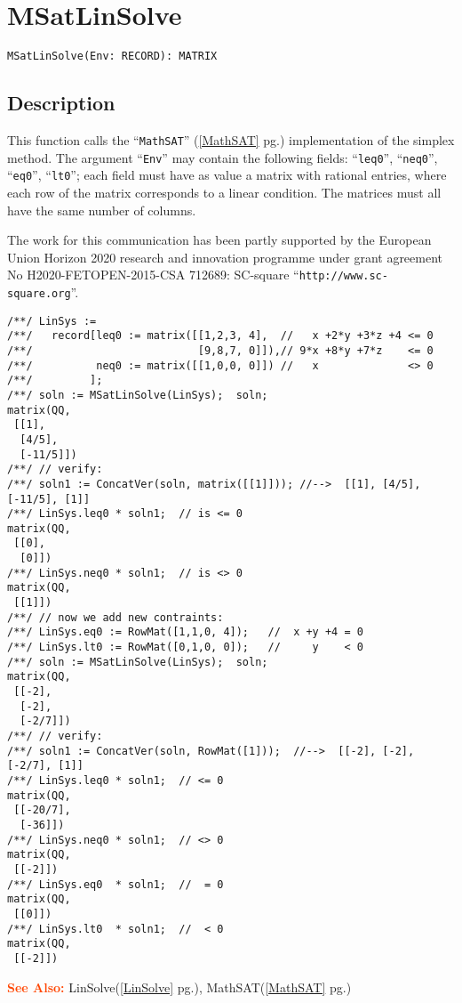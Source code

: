 \documentclass[a4paper]{mybook}
\newenvironment{command}{}{} %
\newcommand\SeeAlso{\par\textcolor{OrangeRed}{\textbf{\large See Also: }}}
\begin{document}
\section{MSatLinSolve}
\label{MSatLinSolve}
\begin{command} %


\begin{Verbatim}[label=syntax, rulecolor=\color{MidnightBlue},
frame=single]
MSatLinSolve(Env: RECORD): MATRIX
\end{Verbatim}


\subsection*{Description}

This function calls the ``\verb&MathSAT&'' (\ref{MathSAT} pg.\pageref{MathSAT}) implementation of the simplex method.
The argument ``\verb&Env&'' may contain the following fields: ``\verb&leq0&'', ``\verb&neq0&'',
``\verb&eq0&'', ``\verb&lt0&''; each field must have as value a matrix with rational entries,
where each row of the matrix corresponds to a linear condition.  The matrices
must all have the same number of columns.
\par 
The work for this communication has been partly supported by the
European Union Horizon 2020 research and innovation programme
under grant agreement No H2020-FETOPEN-2015-CSA 712689:
SC-square ``\verb&http://www.sc-square.org&''.
\begin{Verbatim}[label=example, rulecolor=\color{PineGreen}, frame=single]
/**/ LinSys := 
/**/   record[leq0 := matrix([[1,2,3, 4],  //   x +2*y +3*z +4 <= 0
/**/                          [9,8,7, 0]]),// 9*x +8*y +7*z    <= 0
/**/          neq0 := matrix([[1,0,0, 0]]) //   x              <> 0
/**/         ];
/**/ soln := MSatLinSolve(LinSys);  soln;
matrix(QQ,
 [[1],
  [4/5],
  [-11/5]])
/**/ // verify:
/**/ soln1 := ConcatVer(soln, matrix([[1]])); //-->  [[1], [4/5], [-11/5], [1]]
/**/ LinSys.leq0 * soln1;  // is <= 0
matrix(QQ,
 [[0],
  [0]])
/**/ LinSys.neq0 * soln1;  // is <> 0
matrix(QQ,
 [[1]])
/**/ // now we add new contraints:
/**/ LinSys.eq0 := RowMat([1,1,0, 4]);   //  x +y +4 = 0
/**/ LinSys.lt0 := RowMat([0,1,0, 0]);   //     y    < 0
/**/ soln := MSatLinSolve(LinSys);  soln;
matrix(QQ,
 [[-2],
  [-2],
  [-2/7]])
/**/ // verify:
/**/ soln1 := ConcatVer(soln, RowMat([1]));  //-->  [[-2], [-2], [-2/7], [1]]
/**/ LinSys.leq0 * soln1;  // <= 0
matrix(QQ,
 [[-20/7],
  [-36]])
/**/ LinSys.neq0 * soln1;  // <> 0
matrix(QQ,
 [[-2]])
/**/ LinSys.eq0  * soln1;  //  = 0
matrix(QQ,
 [[0]])
/**/ LinSys.lt0  * soln1;  //  < 0
matrix(QQ,
 [[-2]])
\end{Verbatim}


\SeeAlso %
  LinSolve(\ref{LinSolve} pg.\pageref{LinSolve}), 
    MathSAT(\ref{MathSAT} pg.\pageref{MathSAT})
\end{command} %
\end{document}
